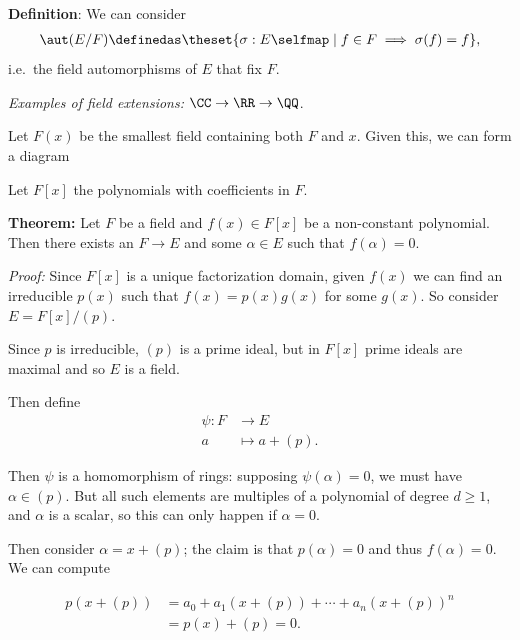 \textbf{Definition}: We can consider
\begin{align*}
\aut(E/F) \definedas \theset{\sigma: E \selfmap \mid f\in F \implies \sigma(f) = f},
\end{align*} i.e.~the field automorphisms of \(E\) that fix \(F\).

\emph{Examples of field extensions:} \(\CC \to \RR \to \QQ\).

Let \(F(x)\) be the smallest field containing both \(F\) and \(x\).
Given this, we can form a diagram

\begin{center}
\end{center}

Let \(F[x]\) the polynomials with coefficients in \(F\).

\textbf{Theorem:} Let \(F\) be a field and \(f(x) \in F[x]\) be a
non-constant polynomial. Then there exists an \(F \to E\) and some
\(\alpha \in E\) such that \(f(\alpha) = 0\).

\emph{Proof:} Since \(F[x]\) is a unique factorization domain, given
\(f(x)\) we can find an irreducible \(p(x)\) such that
\(f(x) = p(x) g(x)\) for some \(g(x)\). So consider \(E = F[x] / (p)\).

Since \(p\) is irreducible, \((p)\) is a prime ideal, but in \(F[x]\)
prime ideals are maximal and so \(E\) is a field.

Then define \begin{align*}
\psi: F &\to E \\
a &\mapsto a + (p)
.\end{align*}

Then \(\psi\) is a homomorphism of rings: supposing
\(\psi(\alpha) = 0\), we must have \(\alpha \in (p)\). But all such
elements are multiples of a polynomial of degree \(d \geq 1\), and
\(\alpha\) is a scalar, so this can only happen if \(\alpha = 0\).

Then consider \(\alpha = x + (p)\); the claim is that \(p(\alpha) = 0\)
and thus \(f(\alpha) = 0\). We can compute

\begin{align*}
p(x + (p)) &= a_0 + a_1(x + (p)) + \cdots + a_n(x + (p))^n \\
&= p(x) + (p) = 0
.\end{align*}


